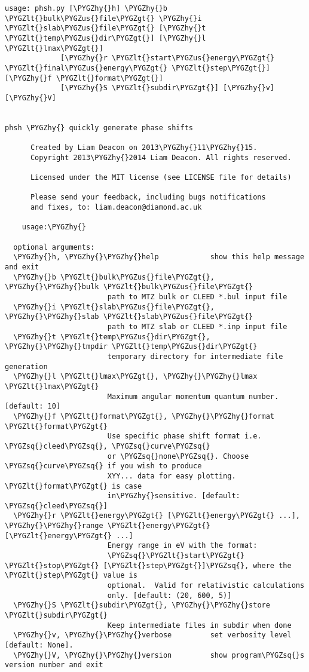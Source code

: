 \documentclass[letterpaper,10pt,english]{sphinxmanual}
\def\PYGZus{\char`\_}
\def\PYGZlt{\char`\<}
\def\PYGZgt{\char`\>}
\def\PYGZhy{\char`\-}
\def\PYGZsq{\char`\'}
\begin{document}
\begin{Verbatim}[commandchars=\\\{\}]
usage: phsh.py [\PYGZhy{}h] \PYGZhy{}b \PYGZlt{}bulk\PYGZus{}file\PYGZgt{} \PYGZhy{}i \PYGZlt{}slab\PYGZus{}file\PYGZgt{} [\PYGZhy{}t \PYGZlt{}temp\PYGZus{}dir\PYGZgt{}] [\PYGZhy{}l \PYGZlt{}lmax\PYGZgt{}]
             [\PYGZhy{}r \PYGZlt{}start\PYGZus{}energy\PYGZgt{} \PYGZlt{}final\PYGZus{}energy\PYGZgt{} \PYGZlt{}step\PYGZgt{}] [\PYGZhy{}f \PYGZlt{}format\PYGZgt{}]
             [\PYGZhy{}S \PYGZlt{}subdir\PYGZgt{}] [\PYGZhy{}v] [\PYGZhy{}V]


phsh \PYGZhy{} quickly generate phase shifts

      Created by Liam Deacon on 2013\PYGZhy{}11\PYGZhy{}15.
      Copyright 2013\PYGZhy{}2014 Liam Deacon. All rights reserved.

      Licensed under the MIT license (see LICENSE file for details)

      Please send your feedback, including bugs notifications
      and fixes, to: liam.deacon@diamond.ac.uk

    usage:\PYGZhy{}

  optional arguments:
  \PYGZhy{}h, \PYGZhy{}\PYGZhy{}help            show this help message and exit
  \PYGZhy{}b \PYGZlt{}bulk\PYGZus{}file\PYGZgt{}, \PYGZhy{}\PYGZhy{}bulk \PYGZlt{}bulk\PYGZus{}file\PYGZgt{}
                        path to MTZ bulk or CLEED *.bul input file
  \PYGZhy{}i \PYGZlt{}slab\PYGZus{}file\PYGZgt{}, \PYGZhy{}\PYGZhy{}slab \PYGZlt{}slab\PYGZus{}file\PYGZgt{}
                        path to MTZ slab or CLEED *.inp input file
  \PYGZhy{}t \PYGZlt{}temp\PYGZus{}dir\PYGZgt{}, \PYGZhy{}\PYGZhy{}tmpdir \PYGZlt{}temp\PYGZus{}dir\PYGZgt{}
                        temporary directory for intermediate file generation
  \PYGZhy{}l \PYGZlt{}lmax\PYGZgt{}, \PYGZhy{}\PYGZhy{}lmax \PYGZlt{}lmax\PYGZgt{}
                        Maximum angular momentum quantum number. [default: 10]
  \PYGZhy{}f \PYGZlt{}format\PYGZgt{}, \PYGZhy{}\PYGZhy{}format \PYGZlt{}format\PYGZgt{}
                        Use specific phase shift format i.e. \PYGZsq{}cleed\PYGZsq{}, \PYGZsq{}curve\PYGZsq{}
                        or \PYGZsq{}none\PYGZsq{}. Choose \PYGZsq{}curve\PYGZsq{} if you wish to produce
                        XYY... data for easy plotting. \PYGZlt{}format\PYGZgt{} is case
                        in\PYGZhy{}sensitive. [default: \PYGZsq{}cleed\PYGZsq{}]
  \PYGZhy{}r \PYGZlt{}energy\PYGZgt{} [\PYGZlt{}energy\PYGZgt{} ...], \PYGZhy{}\PYGZhy{}range \PYGZlt{}energy\PYGZgt{} [\PYGZlt{}energy\PYGZgt{} ...]
                        Energy range in eV with the format:
                        \PYGZsq{}\PYGZlt{}start\PYGZgt{} \PYGZlt{}stop\PYGZgt{} [\PYGZlt{}step\PYGZgt{}]\PYGZsq{}, where the \PYGZlt{}step\PYGZgt{} value is
                        optional.  Valid for relativistic calculations
                        only. [default: (20, 600, 5)]
  \PYGZhy{}S \PYGZlt{}subdir\PYGZgt{}, \PYGZhy{}\PYGZhy{}store \PYGZlt{}subdir\PYGZgt{}
                        Keep intermediate files in subdir when done
  \PYGZhy{}v, \PYGZhy{}\PYGZhy{}verbose         set verbosity level [default: None].
  \PYGZhy{}V, \PYGZhy{}\PYGZhy{}version         show program\PYGZsq{}s version number and exit
\end{Verbatim}
\end{document}
